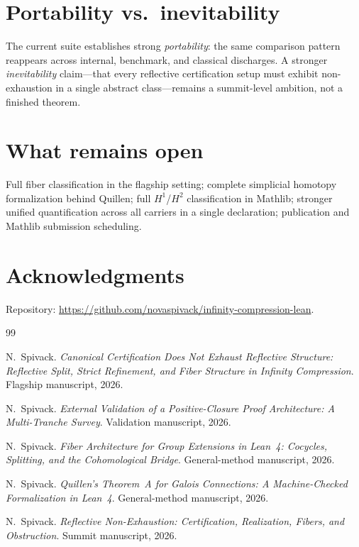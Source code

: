 \documentclass[11pt]{article}
\begin{document}
\section{Portability vs.\ inevitability}

The current suite establishes strong \emph{portability}: the same comparison pattern
reappears across internal, benchmark, and classical discharges. A stronger
\emph{inevitability} claim---that every reflective certification setup must exhibit
non-exhaustion in a single abstract class---remains a summit-level ambition, not a
finished theorem.

\section{What remains open}

Full fiber classification in the flagship setting; complete simplicial homotopy
formalization behind Quillen; full $H^1$/$H^2$ classification in Mathlib; stronger
unified quantification across all carriers in a single declaration; publication and Mathlib
submission scheduling.

\section*{Acknowledgments}

Repository: \url{https://github.com/novaspivack/infinity-compression-lean}.


\begin{thebibliography}{99}

N.~Spivack.
\newblock \emph{Canonical Certification Does Not Exhaust Reflective Structure:
  Reflective Split, Strict Refinement, and Fiber Structure in Infinity Compression}.
\newblock Flagship manuscript, 2026.

N.~Spivack.
\newblock \emph{External Validation of a Positive-Closure Proof Architecture:
  A Multi-Tranche Survey}.
\newblock Validation manuscript, 2026.

N.~Spivack.
\newblock \emph{Fiber Architecture for Group Extensions in Lean~4: Cocycles, Splitting,
  and the Cohomological Bridge}.
\newblock General-method manuscript, 2026.

N.~Spivack.
\newblock \emph{Quillen's Theorem~A for Galois Connections: A Machine-Checked
  Formalization in Lean~4}.
\newblock General-method manuscript, 2026.

N.~Spivack.
\newblock \emph{Reflective Non-Exhaustion: Certification, Realization, Fibers, and Obstruction}.
\newblock Summit manuscript, 2026.

\end{thebibliography}
\end{document}
